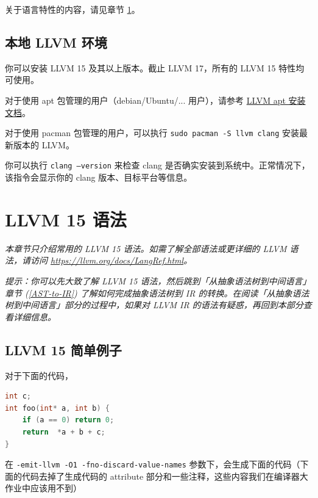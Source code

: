 关于语言特性的内容，请见章节 \ref{LLVM-semantic}。

\subsection{本地 LLVM 环境}

你可以安装 LLVM 15 及其以上版本。截止 LLVM 17，所有的 LLVM 15 特性均可使用。

对于使用 apt 包管理的用户（debian/Ubuntu/... 用户），请参考 \href{https://apt.llvm.org/}{LLVM apt 安装文档}。

对于使用 pacman 包管理的用户，可以执行 \texttt{sudo pacman -S llvm clang} 安装最新版本的 LLVM。

你可以执行 \texttt{clang --version} 来检查 clang 是否确实安装到系统中。正常情况下，该指令会显示你的
clang 版本、目标平台等信息。

\section{LLVM 15 语法}\label{LLVM-semantic}

\textit{本章节只介绍常用的 LLVM 15 语法。如需了解全部语法或更详细的 LLVM 语法，请访问
\url{https://llvm.org/docs/LangRef.html}。}

\textit{提示：你可以先大致了解 LLVM 15 语法，然后跳到「从抽象语法树到中间语言」章节
(\ref{AST-to-IR}) 了解如何完成抽象语法树到 IR
的转换。在阅读「从抽象语法树到中间语言」部分的过程中，如果对 LLVM IR
的语法有疑惑，再回到本部分查看详细信息。}

\subsection{LLVM 15 简单例子}

对于下面的代码，

\begin{lstlisting}[language=C]
int c;
int foo(int* a, int b) {
    if (a == 0) return 0;
    return  *a + b + c;
}
\end{lstlisting}

在 \texttt{-emit-llvm -O1 -fno-discard-value-names}
参数下，会生成下面的代码（下面的代码去掉了生成代码的 attribute
部分和一些注释，这些内容我们在编译器大作业中应该用不到）

